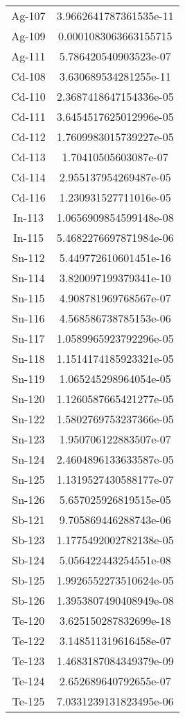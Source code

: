 \begin{table}[h!]
\begin{tabular}{|| c || c |}
Ag-107 & 3.9662641787361535e-11 \\
Ag-109 & 0.0001083063663155715 \\
Ag-111 & 5.786420540903523e-07 \\
Cd-108 & 3.630689534281255e-11 \\
Cd-110 & 2.3687418647154336e-05 \\
Cd-111 & 3.6454517625012996e-05 \\
Cd-112 & 1.7609983015739227e-05 \\
Cd-113 & 1.70410505603087e-07 \\
Cd-114 & 2.955137954269487e-05 \\
Cd-116 & 1.230931527711016e-05 \\
In-113 & 1.0656909854599148e-08 \\
In-115 & 5.4682276697871984e-06 \\
Sn-112 & 5.449772610601451e-16 \\
Sn-114 & 3.820097199379341e-10 \\
Sn-115 & 4.908781969768567e-07 \\
Sn-116 & 4.568586738785153e-06 \\
Sn-117 & 1.0589965923792296e-05 \\
Sn-118 & 1.1514174185923321e-05 \\
Sn-119 & 1.065245298964054e-05 \\
Sn-120 & 1.1260587665421277e-05 \\
Sn-122 & 1.5802769753237366e-05 \\
Sn-123 & 1.950706122883507e-07 \\
Sn-124 & 2.4604896133633587e-05 \\
Sn-125 & 1.1319527430588177e-07 \\
Sn-126 & 5.657025926819515e-05 \\
Sb-121 & 9.705869446288743e-06 \\
Sb-123 & 1.1775492002782138e-05 \\
Sb-124 & 5.056422443254551e-08 \\
Sb-125 & 1.9926552273510624e-05 \\
Sb-126 & 1.3953807490408949e-08 \\
Te-120 & 3.625150287832699e-18 \\
Te-122 & 3.148511319616458e-07 \\
Te-123 & 1.4683187084349379e-09 \\
Te-124 & 2.652689640792655e-07 \\
Te-125 & 7.0331239131823495e-06 \\

\end{tabular}
\end{table}
